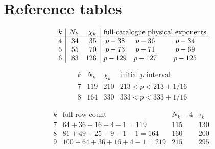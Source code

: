 \documentclass[11pt]{amsart}
\theoremstyle{definition}
\theoremstyle{remark}
\numberwithin{equation}{section}
\newcommand{\partIref}[1]{\hyperref[I:#1]{I.\ref*{I:#1}}}
\begin{document}
\section{Reference tables}\label{app:reference-tables}
\renewcommand{\thetable}{A.\arabic{table}}
\renewcommand{\theHtable}{A.\arabic{table}}
\setcounter{table}{0}


\begin{table}[H]
\centering\small
\caption{Dimensions, characters and physical exponents for degrees four through six, from Lemmas~\partIref{an:character} and~\partIref{an:resource}. The exponents precede any incidence side loss.}\label{app:table-physical}
\[
\begin{array}{c|rr|ccc}
k&N_k&\chi_k&\multicolumn{3}{c}{\text{full-catalogue physical exponents}}\\\hline
4&34&35&p-38&p-36&p-34\\
5&55&70&p-73&p-71&p-69\\
6&83&126&p-129&p-127&p-125
\end{array}
\]
\end{table}

\begin{table}[H]
\centering\small
\caption{Dimensions, characters and initial incidence ranges in degrees seven and eight; see Proposition~\ref{an:unified-incidence}.}\label{app:table-seven-eight}
\[
\begin{array}{c|rr|c}
k&N_k&\chi_k&\text{initial }p\text{ interval}\\\hline
7&119&210&213<p<213+1/16\\
8&164&330&333<p<333+1/16
\end{array}
\]
\end{table}

\begin{table}[H]
\centering\small
\caption{Gauss row counts and fixed-normal powers from Lemmas~\partIref{surf:normal-filtration} and~\partIref{surf:gauss-atlas}.}\label{app:table-gauss-rows}
\[
\begin{array}{c|c|c|c}
k&\text{full row count}&N_k-4&\tau_k\\\hline
7&64+36+16+4-1=119&115&130\\
8&81+49+25+9+1-1=164&160&200\\
9&100+64+36+16+4-1=219&215&295.
\end{array}
\]
\end{table}
\end{document}
